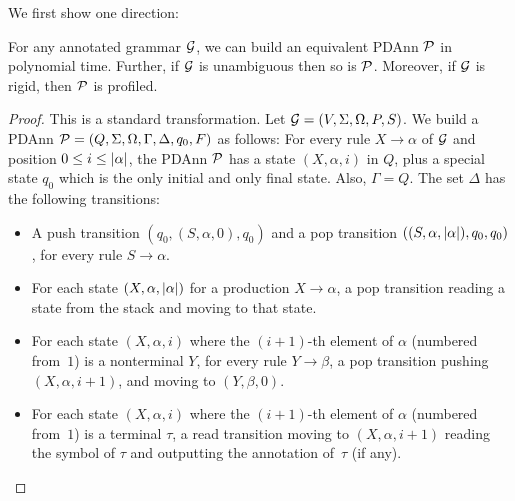 We first show one direction:

\begin{proposition}
	\label{prp:g2pdt}
	For any annotated grammar $\mathcal{G}$, we can build an equivalent PDAnn $\mathcal{P}$ in polynomial
	time. Further, if $\mathcal{G}$ is unambiguous then so is $\mathcal{P}$. Moreover, if $\mathcal{G}$ is rigid, then $\mathcal{P}$ is profiled.
\end{proposition}

\begin{proof}
	This is a standard transformation. Let $\mathcal{G} = (V, \Sigma, \Omega, P, S)$. We build a PDAnn $\mathcal{P} = (Q, \Sigma, \Omega, \Gamma, \Delta, q_0, F)$ as follows: For every rule $X \rightarrow \alpha$ of
	$\mathcal{G}$ and position $0 \leq i \leq \left|\alpha\right|$, the PDAnn $\mathcal{P}$ has a state $(X,
	\alpha, i)$ in $Q$, plus a special state $q_0$ which is the only initial and only
	final state. Also, $\Gamma = Q$. The set $\Delta$ has
	the following transitions:
	\begin{itemize}
		\item A push transition $(q_0, (S, \alpha, 0), q_0)$ and a pop transition $((S, \alpha, \left|\alpha\right|), q_0, q_0)$, for
		every rule $S \rightarrow \alpha$.
		\item For each state $(X, \alpha, \left|\alpha\right|)$ for a production $X
		\rightarrow \alpha$, a pop transition reading a state from the stack and
		moving to that state.
		\item For each state $(X, \alpha, i)$ where the $(i+1)$-th element of $\alpha$
		(numbered from~$1$) is a nonterminal $Y$, for every rule $Y \rightarrow \beta$,
		a pop transition pushing $(X, \alpha, i+1)$, and moving to $(Y, \beta, 0)$.
		\item For each state $(X, \alpha, i)$ where the $(i+1)$-th element of $\alpha$
		(numbered from~$1$) is a terminal $\tau$, a
		read transition moving to $(X, \alpha, i+1)$ reading the symbol of $\tau$
		and outputting the annotation of~$\tau$ (if any).
	\end{itemize}


\end{proof}
